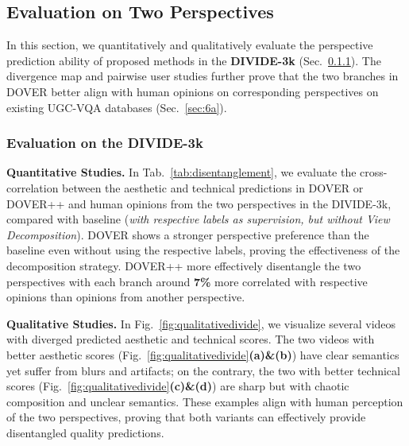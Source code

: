\documentclass[10pt,twocolumn,letterpaper]{article}
\renewcommand{\paragraph}[1]{\noindent \textbf{#1}}
\begin{document}
\subsection{Evaluation on Two Perspectives}
\label{sec:evadisentangle}

In this section, we quantitatively and qualitatively evaluate the perspective prediction ability of proposed methods in the \textbf{DIVIDE-3k} (Sec.~\ref{sec:60}). The divergence map and pairwise user studies further prove that the two branches in DOVER better align with human opinions on corresponding perspectives on existing UGC-VQA databases (Sec.~\ref{sec:6a}).

\subsubsection{Evaluation on the DIVIDE-3k}
\label{sec:60}

\paragraph{Quantitative Studies.} In Tab.~\ref{tab:disentanglement}, we evaluate the cross-correlation between the aesthetic and technical predictions in DOVER or DOVER++ and human opinions from the two perspectives in the DIVIDE-3k, compared with baseline (\textit{with respective labels as supervision, but without View Decomposition}). DOVER shows a stronger perspective preference than the baseline even without using the respective labels, proving the effectiveness of the decomposition strategy. DOVER++ more effectively disentangle the two perspectives with each branch around \textbf{7\%} more correlated with respective opinions than opinions from another perspective.



\paragraph{Qualitative Studies.} In Fig.~\ref{fig:qualitativedivide}, we visualize several videos with diverged predicted aesthetic and technical scores. The two videos with better aesthetic scores (Fig.~\ref{fig:qualitativedivide}\textbf{(a)\&(b)}) have clear semantics yet suffer from blurs and artifacts; on the contrary, the two with better technical scores (Fig.~\ref{fig:qualitativedivide}\textbf{(c)\&(d)}) are sharp but with chaotic composition and unclear semantics. These examples align with human perception of the two perspectives, proving that both variants can effectively provide disentangled quality predictions.
\end{document}
